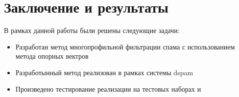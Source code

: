 \newpage
\section{Заключение и результаты}


В рамках данной	работы были решены следующие задачи:
\begin{itemize}
\item Разработан метод многопрофильной фильтрации спама с использованием метода опорных вектров
\item Разработынный метод реализован в рамках системы dspam
\item Произведено тестирование реализации на тестовых наборах \cite{SAPC} и \cite{CEAS}
\end{itemize}


